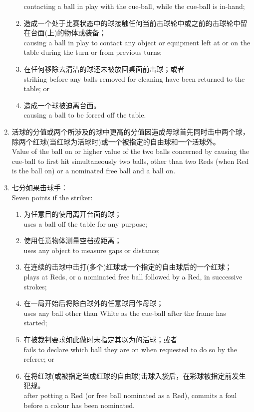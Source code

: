 \begin{enumerate}[label=(\alph*),start=1]
\begin{enumerate}[label=(\roman*)]
        contacting a ball in play with the cue-ball, while the cue-ball is in-hand;
        \item 造成一个处于比赛状态中的球接触任何当前击球轮中或之前的击球轮中留在台面(上)的物体或装备；\\
        causing a ball in play to contact any object or equipment left at or on the table during the turn or from previous turns;
        \item 在任何移除去清洁的球还未被放回桌面前击球；或者\\
        striking before any balls removed for cleaning have been returned to the table; or
        \item 造成一个球被迫离台面。\\
        causing a ball to be forced off the table.
    \end{enumerate}
    \item 活球的分值或两个所涉及的球中更高的分值因造成母球首先同时击中两个球，除两个红球(当红球为活球时)或一个被指定的自由球和一个活球外。\\
    Value of the ball on or higher value of the two balls concerned by causing the cue-ball to first hit simultaneously two balls, other than two Reds (when Red is the ball on) or a nominated free ball and a ball on.
    \item \label{22311d}七分如果击球手：\\
    Seven points if the striker:
    \begin{enumerate}[label=(\roman*)]
        \item 为任意目的使用离开台面的球；\\
        uses a ball off the table for any purpose;
        \item 使用任意物体测量空档或距离；\\
        uses any object to measure gaps or distance;
        \item 在连续的击球中击打(多个)红球或一个指定的自由球后的一个红球；\\
        plays at Reds, or a nominated free ball followed by a Red, in successive strokes;
        \item 在一局开始后将除白球外的任意球用作母球；\\
        uses any ball other than White as the cue-ball after the frame has started;
        \item 在被裁判要求如此做时未指定其以为的活球；或者\\
        fails to declare which ball they are on when requested to do so by the referee; or
        \item 在将红球(或被指定当成红球的自由球)击球入袋后，在彩球被指定前发生犯规。\\
        after potting a Red (or free ball nominated as a Red), commits a foul before a colour has been nominated.
    \end{enumerate}
\end{enumerate}
